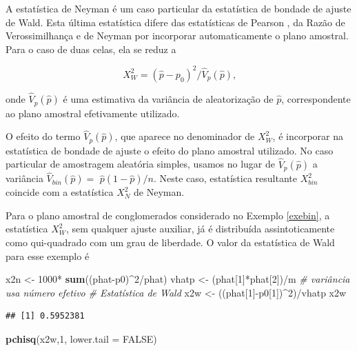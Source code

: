 \documentclass[]{book}
\newenvironment{Shaded}{\begin{snugshade}}{\end{snugshade}}
\newcommand{\KeywordTok}[1]{\textcolor[rgb]{0.13,0.29,0.53}{\textbf{{#1}}}}
\newcommand{\DataTypeTok}[1]{\textcolor[rgb]{0.13,0.29,0.53}{{#1}}}
\newcommand{\DecValTok}[1]{\textcolor[rgb]{0.00,0.00,0.81}{{#1}}}
\newcommand{\StringTok}[1]{\textcolor[rgb]{0.31,0.60,0.02}{{#1}}}
\newcommand{\CommentTok}[1]{\textcolor[rgb]{0.56,0.35,0.01}{\textit{{#1}}}}
\newcommand{\OtherTok}[1]{\textcolor[rgb]{0.56,0.35,0.01}{{#1}}}
\newcommand{\NormalTok}[1]{{#1}}
\numberwithin{example}{chapter}
\numberwithin{remark}{chapter}
\numberwithin{definition}{chapter}
\begin{document}
A estatística de Neyman é um caso particular da estatística de bondade
de ajuste de Wald. Esta última estatística difere das estatísticas de
Pearson , da Razão de Verossimilhança e de Neyman por incorporar
automaticamente o plano amostral. Para o caso de duas celas, ela se
reduz a

\begin{equation}
X_{W}^{2}=\left( \widehat{p}-p_{0}\right) ^{2}/\hat{V}_{p}\left( \widehat{p}
\right) \mbox{,}  
\label{eq:qual7}
\end{equation}

onde \(\hat{V}_{p}\left( \widehat{p}\right)\) é uma estimativa da
variância de aleatorização de \(\hat{p}\), correspondente ao plano
amostral efetivamente utilizado.

O efeito do termo \(\hat{V}_{p}\left( \widehat{p}\right)\), que aparece
no denominador de \(X_{W}^{2}\), é incorporar na estatística de bondade
de ajuste o efeito do plano amostral utilizado. No caso particular de
amostragem aleatória simples, usamos no lugar de
\(\widehat{V}_{p}\left( \widehat{p}\right)\) a variância
\(\widehat{V}_{bin}\left( \widehat{p}\right) =\)
\(\widehat{p}\left( 1-\widehat{p}\right) /n\). Neste caso, estatística
resultante \(X_{bin}^{2}\) coincide com a estatística \(X_{N}^{2}\) de
Neyman.

Para o plano amostral de conglomerados considerado no Exemplo
\ref{exebin}, a estatística \(X_{W}^{2}\), sem qualquer ajuste auxiliar,
já é distribuída assintoticamente como qui-quadrado com um grau de
liberdade. O valor da estatística de Wald para esse exemplo é

\begin{Shaded}
\begin{Highlighting}[]
\NormalTok{x2n <-}\StringTok{ }\DecValTok{1000}\NormalTok{*}\StringTok{ }\KeywordTok{sum}\NormalTok{((phat-p0)^}\DecValTok{2}\NormalTok{/phat)}
\NormalTok{vhatp <-}\StringTok{ }\NormalTok{(phat[}\DecValTok{1}\NormalTok{]*phat[}\DecValTok{2}\NormalTok{])/m }\CommentTok{# variância usa número efetivo}
\CommentTok{# Estatística de Wald}
\NormalTok{x2w <-}\StringTok{ }\NormalTok{((phat[}\DecValTok{1}\NormalTok{]-p0[}\DecValTok{1}\NormalTok{])^}\DecValTok{2}\NormalTok{)/vhatp}
\NormalTok{x2w}
\end{Highlighting}
\end{Shaded}

\begin{verbatim}
## [1] 0.5952381
\end{verbatim}

\begin{Shaded}
\begin{Highlighting}[]
\KeywordTok{pchisq}\NormalTok{(x2w,}\DecValTok{1}\NormalTok{, }\DataTypeTok{lower.tail =} \OtherTok{FALSE}\NormalTok{)}
\end{Highlighting}
\end{Shaded}
\end{document}
